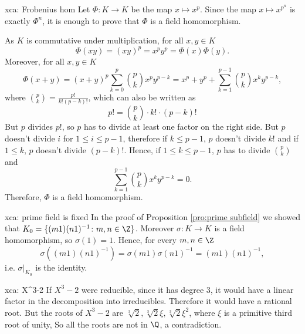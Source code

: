 \begin{sol}{xca: Frobenius hom}
Let $\Phi: K\to K$ be the map 
$x\mapsto x^{p}$.
Since the map $x\mapsto x^{p^n}$
is exactly $\Phi^n$,
it is enough to prove that $\Phi$ is a field homomorphism.

As $K$ is commutative under multiplication, 
for all $x,y \in K$ 
        \[
        \Phi(xy) = (xy)^p = x^py^p = \Phi(x) \Phi(y).
        \]
Moreover, for all $x,y \in K$ 
\[
\Phi(x+y) =
(x+y)^p \sum_{k=0}^p \binom{p}{k}x^py^{p-k}=
x^p + y^p + \sum_{k=1}^{p-1} \binom{p}{k}x^ky^{p-k} ,
\]
where $\binom{p}{k} = \frac{p!}{k!(p-k)!}$,
which can also be written as
        \[
        p! = \binom{p}{k} \cdot k! \cdot (p-k)!
        \]
But $p$ divides $p!$, so $p$
has to divide at least one 
factor on the right side. 
But $p$ doesn't divide $i$
 for $1 \leq i \leq p-1$, therefore if $k \leq p-1$, $p$ doesn't divide
$k!$ and if $1 \leq  k$, $p$ doesn't divide $(p-k)!$. 
Hence, if $1 \leq k \leq p-1$, $p$ has to divide $\binom{p}{k}$ and 
\[
\sum_{k=1}^{p-1} \binom{p}{k}x^ky^{p-k}=0.
\]
Therefore, $\Phi$ is a field homomorphism.
\end{sol}

\begin{sol}{xca: prime field is fixed}
    In the proof of Proposition \ref{pro:prime subfield}
    we showed that 
    $K_0=\{(m1)(n1)^{-1}\colon m,n\in \Z\}$.
    Moreover $\sigma:K\to K$ is a field homomorphism,
    so  $\sigma(1)=1$.
    Hence, for every $m,n\in\Z$
    \[
    \sigma\left((m1)(n1)^{-1}\right)=\sigma(m1)\sigma(n1)^{-1}=(m1)(n1)^{-1},
    \]
    i.e. $\sigma|_{K_0}$ is the identity.
\end{sol}

\begin{sol}{xca: X^3-2}
    If $X^3-2$ were reducible, since it has degree 3,
    it would have a linear
    factor in the decomposition into irreducibles.
    Therefore it would have a rational root.
    But the roots of $X^3-2$ are $\sqrt[3]{2},\sqrt[3]{2}\xi,\sqrt[3]{2}\xi^2$,
    where $\xi$ is a primitive third root of unity,
    So all the roots are not in $\Q$, a contradiction.
\end{sol}

